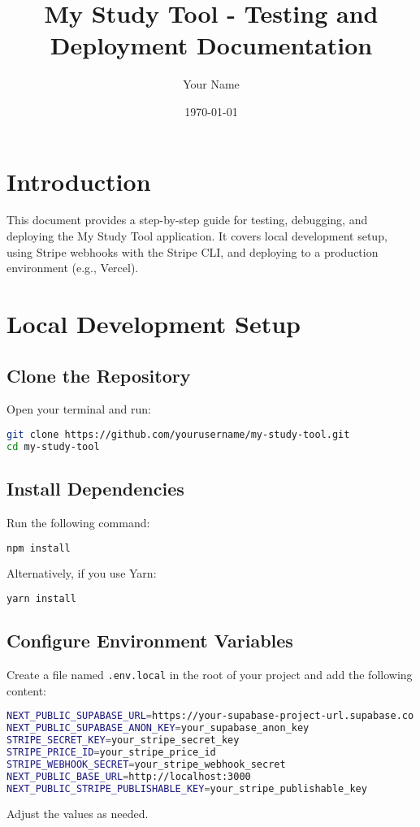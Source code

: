 \documentclass[11pt]{article}
\title{My Study Tool - Testing and Deployment Documentation}
\author{Your Name}
\date{\today}
\begin{document}
\maketitle
\tableofcontents
\newpage

\section{Introduction}
This document provides a step-by-step guide for testing, debugging, and deploying the My Study Tool application. It covers local development setup, using Stripe webhooks with the Stripe CLI, and deploying to a production environment (e.g., Vercel).

\section{Local Development Setup}

\subsection{Clone the Repository}
Open your terminal and run:
\begin{lstlisting}[language=bash]
git clone https://github.com/yourusername/my-study-tool.git
cd my-study-tool
\end{lstlisting}

\subsection{Install Dependencies}
Run the following command:
\begin{lstlisting}[language=bash]
npm install
\end{lstlisting}
Alternatively, if you use Yarn:
\begin{lstlisting}[language=bash]
yarn install
\end{lstlisting}

\subsection{Configure Environment Variables}
Create a file named \texttt{.env.local} in the root of your project and add the following content:
\begin{lstlisting}[language=bash]
NEXT_PUBLIC_SUPABASE_URL=https://your-supabase-project-url.supabase.co
NEXT_PUBLIC_SUPABASE_ANON_KEY=your_supabase_anon_key
STRIPE_SECRET_KEY=your_stripe_secret_key
STRIPE_PRICE_ID=your_stripe_price_id
STRIPE_WEBHOOK_SECRET=your_stripe_webhook_secret
NEXT_PUBLIC_BASE_URL=http://localhost:3000
NEXT_PUBLIC_STRIPE_PUBLISHABLE_KEY=your_stripe_publishable_key
\end{lstlisting}
Adjust the values as needed.
\end{document}
